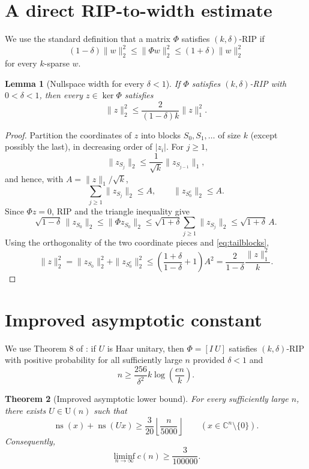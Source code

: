\documentclass[11pt]{article}
\newtheorem{theorem}{Theorem}
\newtheorem{lemma}[theorem]{Lemma}
\theoremstyle{remark}
\newcommand{\C}{\mathbb C}
\newcommand{\ns}{\operatorname{ns}}
\newcommand{\1}{\mathbf 1}
\begin{document}
\section{A direct RIP-to-width estimate}

We use the standard definition that a matrix $\Phi$ satisfies
$(k,\delta)$-RIP if
\[
 (1-\delta)\|w\|_2^2\le\|\Phi w\|_2^2
 \le(1+\delta)\|w\|_2^2
\]
for every $k$-sparse $w$.

\begin{lemma}[Nullspace width for every $\delta<1$]\label{lem:width}
If $\Phi$ satisfies $(k,\delta)$-RIP with $0<\delta<1$, then every
$z\in\ker\Phi$ satisfies
\begin{equation}\label{eq:width}
 \|z\|_2^2\le\frac{2}{(1-\delta)k}\|z\|_1^2.
\end{equation}
\end{lemma}

\begin{proof}
Partition the coordinates of $z$ into blocks $S_0,S_1,\ldots$ of size $k$
(except possibly the last), in decreasing order of $|z_i|$.  For $j\ge1$,
\[
 \|z_{S_j}\|_2
 \le\frac1{\sqrt k}\|z_{S_{j-1}}\|_1,
\]
and hence, with $A=\|z\|_1/\sqrt k$,
\begin{equation}\label{eq:tailblocks}
 \sum_{j\ge1}\|z_{S_j}\|_2\le A,
 \qquad \|z_{S_0^c}\|_2\le A.
\end{equation}
Since $\Phi z=0$, RIP and the triangle inequality give
\[
 \sqrt{1-\delta}\,\|z_{S_0}\|_2
 \le\|\Phi z_{S_0}\|_2
 \le\sqrt{1+\delta}\sum_{j\ge1}\|z_{S_j}\|_2
 \le\sqrt{1+\delta}\,A.
\]
Using the orthogonality of the two coordinate pieces and
\eqref{eq:tailblocks},
\[
 \|z\|_2^2
 =\|z_{S_0}\|_2^2+\|z_{S_0^c}\|_2^2
 \le\left(\frac{1+\delta}{1-\delta}+1\right)A^2
 =\frac{2}{1-\delta}\frac{\|z\|_1^2}{k}.
\]
\end{proof}

\section{Improved asymptotic constant}

We use Theorem 8 of \cite{BLM}: if $U$ is Haar unitary, then
$\Phi=[I\ U]$ satisfies $(k,\delta)$-RIP with positive probability for all
sufficiently large $n$ provided $\delta<1$ and
\begin{equation}\label{eq:source-rip}
 n\ge\frac{256}{\delta^2}k\log\!\left(\frac{en}{k}\right).
\end{equation}

\begin{theorem}[Improved asymptotic lower bound]\label{thm:asymptotic}
For every sufficiently large $n$, there exists $U\in\mathrm U(n)$ such that
\[
 \ns(x)+\ns(Ux)\ge\frac3{20}\left\lfloor\frac n{5000}\right\rfloor
 \qquad(x\in\C^n\setminus\{0\}).
\]
Consequently,
\[
 \boxed{\displaystyle\liminf_{n\to\infty}c(n)\ge\frac3{100000}.}
\]
\end{theorem}
\end{document}
